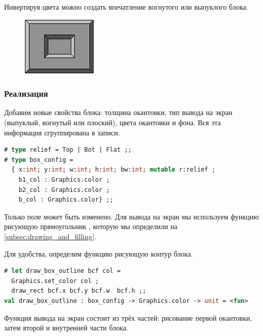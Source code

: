 Инвертируя цвета можно создать впечатление вогнутого или выпуклого блока.

\begin{figure}[h]
	\includegraphics[scale=0.4]{drafts/book-ora013}
\end{figure}

\subsubsection{Реализация}

Добавим новые свойства блока: толщина окантовки, тип вывода на экран (выпуклый, 
вогнутый или плоский), цвета окантовки и фона. Вся эта информация сгруппирована 
в записи.

\begin{lstlisting}[language=OCaml]
# type relief = Top | Bot | Flat ;;
# type box_config =
  { x:int; y:int; w:int; h:int; bw:int; mutable r:relief ;
    b1_col : Graphics.color ;
    b2_col : Graphics.color ;
    b_col : Graphics.color} ;;
\end{lstlisting}

Только поле  может быть изменено. Для вывода на экран мы используем 
функцию рисующую прямоугольник , которую мы определили на 
\ref{subsec:drawing_and_filling}.

Для удобства, определим функцию рисующую контур блока.

\begin{lstlisting}[language=OCaml]
# let draw_box_outline bcf col = 
  Graphics.set_color col ;
  draw_rect bcf.x bcf.y bcf.w  bcf.h ;;
val draw_box_outline : box_config -> Graphics.color -> unit = <fun>
\end{lstlisting}

Функция вывода на экран состоит из трёх частей: рисование первой окантовки, 
затем второй и внутренней части блока.

